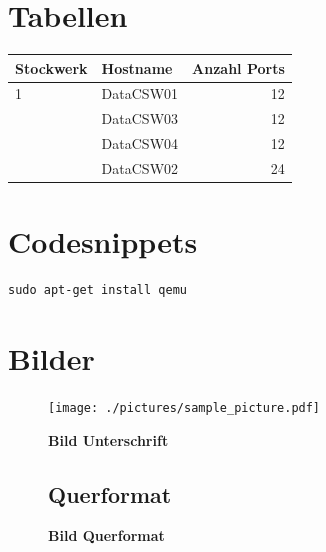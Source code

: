 \documentclass[a4,12pt]{scrartcl}
\begin{document}
\section{Tabellen}
\begin{center}
    \begin{tabular}{@{} l l r@{}}\toprule    
    {Stockwerk} & {Hostname} & {Anzahl Ports}\\ \midrule
    1 & DataCSW01 & 12\\ \addlinespace
    & DataCSW03 & 12\\ \addlinespace
    & DataCSW04 & 12\\ \addlinespace
    2& DataCSW02 & 24\\
    \bottomrule
    \end{tabular}
\end{center}

\section{Codesnippets}
\begin{lstlisting}
sudo apt-get install qemu
\end{lstlisting}

\section{Bilder}
\begin{figure} [H]
	\begin{center}
	\texttt{[image: ./pictures/sample\_picture.pdf]}
	\caption{\textbf{Bild Unterschrift}}
	\label{Bild Referenz}
	\end{center}
\end{figure}

\begin{landscape}
\begin{figure}[htbp]
\subsection{Querformat}
\centering
{}
\caption{\textbf{Bild Querformat}}
\end{figure}
\end{landscape}	
\end{document}
